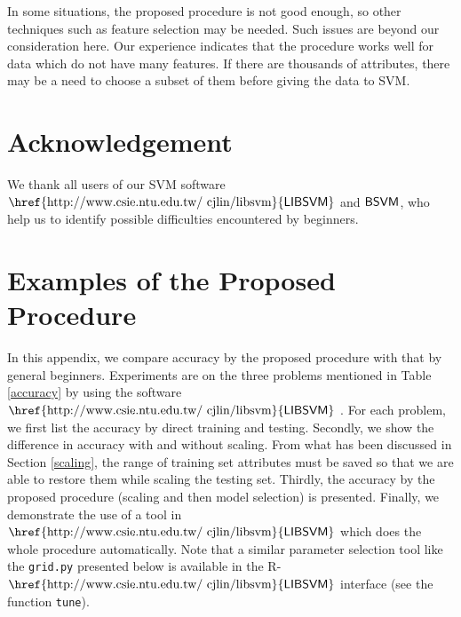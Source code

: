\documentclass[12pt]{article}
\newcommand{\libsvm}{$\mbox{\href{http://www.csie.ntu.edu.tw/~cjlin/libsvm}{\sf LIBSVM}}$\xspace}
\newcommand{\bsvm}{$\mbox{{\sf BSVM}}$\xspace}
\begin{document}
In some situations, the proposed procedure is not good
enough, so other techniques such as feature selection may
be needed. Such issues are beyond our consideration
here. Our experience indicates that the
procedure works well for data which do not
have many features. 
If there are thousands of
attributes, there may be a need to choose a 
subset of them before giving the data to SVM.

\section*{Acknowledgement}
We thank all users of our SVM software
\libsvm and \bsvm, who help us to identify
possible difficulties encountered by beginners.

\appendix

\section{Examples of the Proposed Procedure}
\label{app}

In this appendix, we compare accuracy
by the proposed procedure with that by general beginners.
Experiments are on the three problems mentioned in
Table \ref{accuracy} by using the software \libsvm
\cite{CC01a}. For each problem, we first list the
accuracy by direct training and testing. Secondly, we show 
the difference in accuracy with and without scaling.
From what has been discussed in Section \ref{scaling},
the range of training set attributes must 
be saved so that we are able to restore them while
scaling the testing set.
Thirdly, the accuracy by the proposed procedure (scaling 
and then model selection) is presented. Finally, we demonstrate 
the use of a tool in \libsvm which does 
the whole procedure automatically. Note that a similar 
parameter selection tool like the {\tt grid.py} presented below
is available in the R-\libsvm interface
(see the function {\tt tune}).
\end{document}
